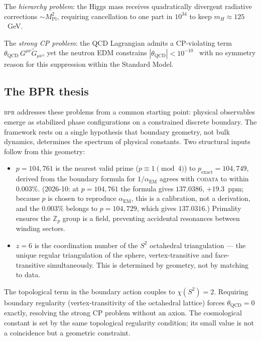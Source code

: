 \documentclass[aps,prd,twocolumn,superscriptaddress,longbibliography,nofootinbib]{revtex4-2}
\newcommand{\Zp}{\mathbb{Z}_p}
\newcommand{\Stwo}{S^2}
\newcommand{\alphaEM}{\alpha_{\mathrm{EM}}}
\newcommand{\bpr}{\textsc{bpr}}
\begin{document}
The \textit{hierarchy problem}: the Higgs mass receives quadratically divergent
radiative corrections $\sim M_{\mathrm{Pl}}^2$, requiring cancellation to one
part in $10^{34}$ to keep $m_H \approx 125$~GeV.

The \textit{strong CP problem}: the QCD Lagrangian admits a CP-violating term
$\theta_{\mathrm{QCD}}\, G^{\mu\nu}\tilde{G}_{\mu\nu}$, yet the neutron EDM
constrains $|\theta_{\mathrm{QCD}}| < 10^{-10}$~\cite{PDG2024} with no
symmetry reason for this suppression within the Standard Model.

\subsection{The BPR thesis}

\bpr{} addresses these problems from a common starting point: physical
observables emerge as stabilized phase configurations on a constrained
discrete boundary.  The framework rests on a single hypothesis that boundary
geometry, not bulk dynamics, determines the spectrum of physical constants.
Two structural inputs follow from this geometry:

\begin{itemize}
\item $p = 104{,}761$ is the nearest valid prime ($p\equiv 1\pmod{4}$) to $p_\text{exact}=104{,}749$, derived from the boundary formula
  for $1/\alphaEM$ agrees with \textsc{codata} to within $0.003\%$.
  (2026-10: at $p = 104{,}761$ the formula gives $137.0386$,
  $+19.3$~ppm; because $p$ is chosen to reproduce $\alphaEM$, this is a
  calibration, not a derivation, and the $0.003\%$ belongs to
  $p = 104{,}729$, which gives $137.0316$.)
  Primality ensures the $\Zp$ group is a field, preventing accidental
  resonances between winding sectors.
\item $z = 6$ is the coordination number of the $\Stwo$ octahedral triangulation
  --- the unique regular triangulation of the sphere, vertex-transitive and
  face-transitive simultaneously.  This is determined by geometry, not by
  matching to data.
\end{itemize}

The topological term in the boundary action couples to $\chi(\Stwo) = 2$.
Requiring boundary regularity (vertex-transitivity of the octahedral lattice)
forces $\theta_{\mathrm{QCD}} = 0$ exactly, resolving the strong CP problem
without an axion.  The cosmological constant is set by the same topological
regularity condition; its small value is not a coincidence but a geometric
constraint.
\end{document}
